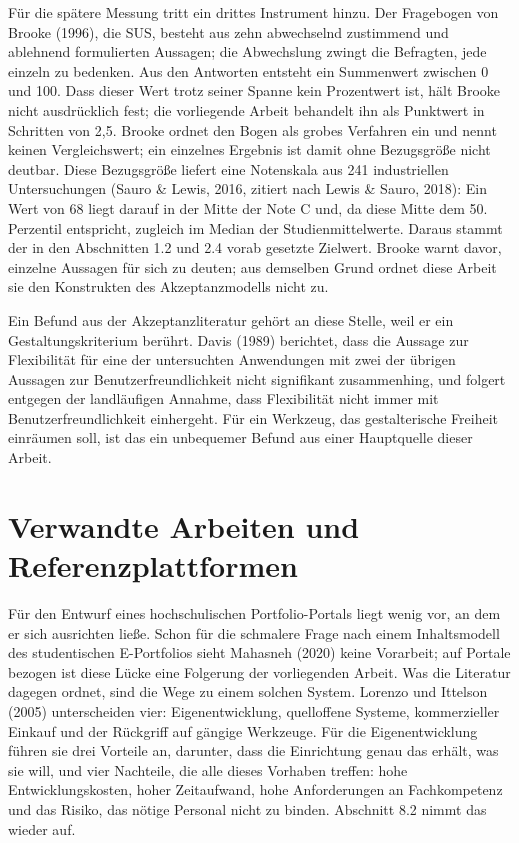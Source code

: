 Für die spätere Messung tritt ein drittes Instrument hinzu. Der Fragebogen von Brooke (1996), die SUS, besteht aus zehn abwechselnd zustimmend und ablehnend formulierten Aussagen; die Abwechslung zwingt die Befragten, jede einzeln zu bedenken. Aus den Antworten entsteht ein Summenwert zwischen 0 und 100. Dass dieser Wert trotz seiner Spanne kein Prozentwert ist, hält Brooke nicht ausdrücklich fest; die vorliegende Arbeit behandelt ihn als Punktwert in Schritten von 2,5. Brooke ordnet den Bogen als grobes Verfahren ein und nennt keinen Vergleichswert; ein einzelnes Ergebnis ist damit ohne Bezugsgröße nicht deutbar. Diese Bezugsgröße liefert eine Notenskala aus 241 industriellen Untersuchungen (Sauro \& Lewis, 2016, zitiert nach Lewis \& Sauro, 2018): Ein Wert von 68 liegt darauf in der Mitte der Note C und, da diese Mitte dem 50. Perzentil entspricht, zugleich im Median der Studienmittelwerte. Daraus stammt der in den Abschnitten 1.2 und 2.4 vorab gesetzte Zielwert. Brooke warnt davor, einzelne Aussagen für sich zu deuten; aus demselben Grund ordnet diese Arbeit sie den Konstrukten des Akzeptanzmodells nicht zu.

Ein Befund aus der Akzeptanzliteratur gehört an diese Stelle, weil er ein Gestaltungskriterium berührt. Davis (1989) berichtet, dass die Aussage zur Flexibilität für eine der untersuchten Anwendungen mit zwei der übrigen Aussagen zur Benutzerfreundlichkeit nicht signifikant zusammenhing, und folgert entgegen der landläufigen Annahme, dass Flexibilität nicht immer mit Benutzerfreundlichkeit einhergeht. Für ein Werkzeug, das gestalterische Freiheit einräumen soll, ist das ein unbequemer Befund aus einer Hauptquelle dieser Arbeit.

\section{Verwandte Arbeiten und Referenzplattformen}
\label{sec:verwandte-arbeiten}

Für den Entwurf eines hochschulischen Portfolio-Portals liegt wenig vor, an dem er sich ausrichten ließe. Schon für die schmalere Frage nach einem Inhaltsmodell des studentischen E-Portfolios sieht Mahasneh (2020) keine Vorarbeit; auf Portale bezogen ist diese Lücke eine Folgerung der vorliegenden Arbeit. Was die Literatur dagegen ordnet, sind die Wege zu einem solchen System. Lorenzo und Ittelson (2005) unterscheiden vier: Eigenentwicklung, quelloffene Systeme, kommerzieller Einkauf und der Rückgriff auf gängige Werkzeuge. Für die Eigenentwicklung führen sie drei Vorteile an, darunter, dass die Einrichtung genau das erhält, was sie will, und vier Nachteile, die alle dieses Vorhaben treffen: hohe Entwicklungskosten, hoher Zeitaufwand, hohe Anforderungen an Fachkompetenz und das Risiko, das nötige Personal nicht zu binden. Abschnitt 8.2 nimmt das wieder auf.

